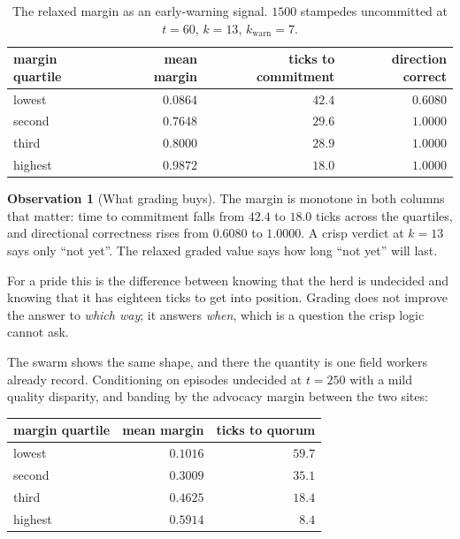 \documentclass[11pt,a4paper]{article}
\theoremstyle{plain}
\theoremstyle{definition}
\newtheorem{observation}[theorem]{Observation}
\theoremstyle{remark}
\begin{document}
\begin{table}[t]
\centering
\begin{tabular}{@{}lrrr@{}}
\toprule
margin quartile & mean margin & ticks to commitment & direction correct\\
\midrule
lowest  & $0.0864$ & $42.4$ & $0.6080$\\
second  & $0.7648$ & $29.6$ & $1.0000$\\
third   & $0.8000$ & $28.9$ & $1.0000$\\
highest & $0.9872$ & $18.0$ & $1.0000$\\
\bottomrule
\end{tabular}
\caption{The relaxed margin as an early-warning signal. $1500$ stampedes
uncommitted at $t = 60$, $k = 13$, $k_{\mathrm{warn}} = 7$.}
\label{tab:clock}
\end{table}

\begin{observation}[What grading buys]\label{obs:clock}
The margin is monotone in both columns that matter: time to commitment falls
from $42.4$ to $18.0$ ticks across the quartiles, and directional correctness
rises from $0.6080$ to $1.0000$. A crisp verdict at $k=13$ says only ``not
yet''. The relaxed graded value says how long ``not yet'' will last.
\end{observation}

For a pride this is the difference between knowing that the herd is undecided
and knowing that it has eighteen ticks to get into position. Grading does not
improve the answer to \emph{which way}; it answers \emph{when}, which is a
question the crisp logic cannot ask.

The swarm shows the same shape, and there the quantity is one field workers
already record. Conditioning on episodes undecided at $t = 250$ with a mild
quality disparity, and banding by the advocacy margin between the two sites:

\begin{center}
\begin{tabular}{@{}lrr@{}}
\toprule
margin quartile & mean margin & ticks to quorum\\
\midrule
lowest  & $0.1016$ & $59.7$\\
second  & $0.3009$ & $35.1$\\
third   & $0.4625$ & $18.4$\\
highest & $0.5914$ & $8.4$\\
\bottomrule
\end{tabular}
\end{center}
\end{document}
